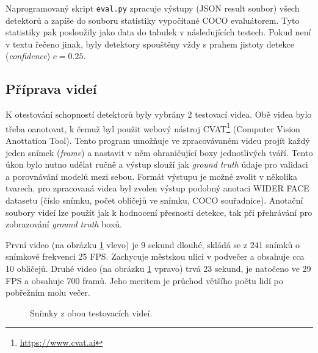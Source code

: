 Naprogramovaný skript \texttt{eval.py} zpracuje výstupy (JSON result soubor) všech detektorů a zapíše do souboru statistiky vypočítané COCO evaluátorem. Tyto statistiky pak posloužily jako data do tabulek v následujících testech. Pokud není v textu řečeno jinak, byly detektory spouštěny vždy s prahem jistoty detekce (\emph{confidence}) $c = 0.25$.


\subsection*{Příprava videí}
K otestování schopností detektorů byly vybrány 2 testovací videa. Obě videa bylo třeba oanotovat, k čemuž byl použit webový nástroj CVAT\footnote{\url{https://www.cvat.ai}} (Computer Vision Anottation Tool). 
Tento program umožňuje ve zpracovávaném videu projít každý jeden snímek (\emph{frame}) a nastavit v něm ohraničující boxy jednotlivých tváří. Tento úkon bylo nutno udělat ručně a výstup slouží jak \emph{ground truth} údaje pro validaci a porovnávání modelů mezi sebou. Formát výstupu je možné zvolit v několika tvarech, pro zpracovaná videa byl zvolen výstup podobný anotaci WIDER FACE datasetu (číslo snímku, počet obličejů ve snímku, COCO souřadnice). Anotační soubory videí lze použít jak k hodnocení přesnosti detekce, tak při přehrávání pro zobrazování \emph{ground truth} boxů. 

První video (na obrázku \ref{obrazek:videa} vlevo) je 9 sekund dlouhé, skládá se z 241 snímků o snímkové frekvenci 25 FPS. Zachycuje městskou ulici v podvečer a obsahuje cca 10 obličejů. Druhé video (na obrázku \ref{obrazek:videa} vpravo) trvá 23 sekund, je natočeno ve 29 FPS a obsahuje 700 framů. Jeho meritem je průchod většího počtu lidí po pobřežním molu večer.

\begin{figure}[H] 
  \begin{center}
  \label{obrazek:videa}
  \caption{Snímky z obou testovacích videí.}
  \end{center}
\end{figure}

